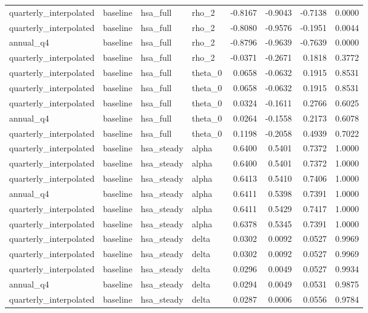 \begin{tabular}{llllrrrr}
quarterly\_interpolated & baseline & hsa\_full & rho\_2 & -0.8167 & -0.9043 & -0.7138 & 0.0000 \\
quarterly\_interpolated & baseline & hsa\_full & rho\_2 & -0.8080 & -0.9576 & -0.1951 & 0.0044 \\
annual\_q4 & baseline & hsa\_full & rho\_2 & -0.8796 & -0.9639 & -0.7639 & 0.0000 \\
quarterly\_interpolated & baseline & hsa\_full & rho\_2 & -0.0371 & -0.2671 & 0.1818 & 0.3772 \\
quarterly\_interpolated & baseline & hsa\_full & theta\_0 & 0.0658 & -0.0632 & 0.1915 & 0.8531 \\
quarterly\_interpolated & baseline & hsa\_full & theta\_0 & 0.0658 & -0.0632 & 0.1915 & 0.8531 \\
quarterly\_interpolated & baseline & hsa\_full & theta\_0 & 0.0324 & -0.1611 & 0.2766 & 0.6025 \\
annual\_q4 & baseline & hsa\_full & theta\_0 & 0.0264 & -0.1558 & 0.2173 & 0.6078 \\
quarterly\_interpolated & baseline & hsa\_full & theta\_0 & 0.1198 & -0.2058 & 0.4939 & 0.7022 \\
quarterly\_interpolated & baseline & hsa\_steady & alpha & 0.6400 & 0.5401 & 0.7372 & 1.0000 \\
quarterly\_interpolated & baseline & hsa\_steady & alpha & 0.6400 & 0.5401 & 0.7372 & 1.0000 \\
quarterly\_interpolated & baseline & hsa\_steady & alpha & 0.6413 & 0.5410 & 0.7406 & 1.0000 \\
annual\_q4 & baseline & hsa\_steady & alpha & 0.6411 & 0.5398 & 0.7391 & 1.0000 \\
quarterly\_interpolated & baseline & hsa\_steady & alpha & 0.6411 & 0.5429 & 0.7417 & 1.0000 \\
quarterly\_interpolated & baseline & hsa\_steady & alpha & 0.6378 & 0.5345 & 0.7391 & 1.0000 \\
quarterly\_interpolated & baseline & hsa\_steady & delta & 0.0302 & 0.0092 & 0.0527 & 0.9969 \\
quarterly\_interpolated & baseline & hsa\_steady & delta & 0.0302 & 0.0092 & 0.0527 & 0.9969 \\
quarterly\_interpolated & baseline & hsa\_steady & delta & 0.0296 & 0.0049 & 0.0527 & 0.9934 \\
annual\_q4 & baseline & hsa\_steady & delta & 0.0294 & 0.0049 & 0.0531 & 0.9875 \\
quarterly\_interpolated & baseline & hsa\_steady & delta & 0.0287 & 0.0006 & 0.0556 & 0.9784 \\

\end{tabular}
